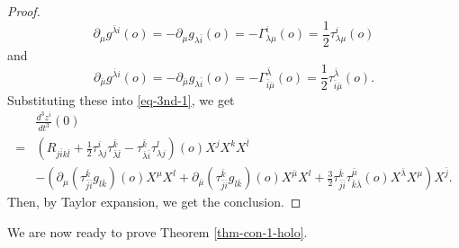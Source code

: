 \documentclass[12pt]{amsart}
\def\bk{{\bar k}}
\def\bl{{\bar l}}
\def\p{\partial}
\theoremstyle{definition}
\theoremstyle{remark}
\numberwithin{equation}{section}
\def\bi{{\bar i}}
\begin{document}
\begin{proof}
\begin{equation}
\p_\mu g^{\bar \lambda i}(o)=-\p_\mu g_{\lambda\bi}(o)=-\Gamma_{\lambda\mu}^i(o)=\frac12\tau_{\lambda\mu}^i(o)
\end{equation}
and
\begin{equation}
\p_{\bar \mu} g^{\bar\lambda i}(o)=-\p_{\bar \mu} g_{\lambda \bi}(o)=-\Gamma_{\bi\bar\mu}^{\bar\lambda}(o)=\frac12\tau_{\bi\bar\mu}^{\bar\lambda}(o).
\end{equation}
Substituting these into \eqref{eq-3nd-1}, we get
\begin{equation}\label{eq-3nd-2}
\begin{split}
&\frac{d^3z^i}{dt^3}(0)\\
=&\left(R_{j\bi k\bl}+\frac12\tau_{\lambda j}^i\tau_{\bar\lambda\bar l}^\bk -\tau_{\bar \lambda \bi}^\bk\tau_{\lambda j}^l\right)(o) X^j X^k X^{\bar l}\\
&-\left(\p_\mu(\tau_{\bar j\bi}^\bk g_{l\bk})(o)X^\mu X^l
+\p_{\bar \mu}(\tau_{\bar j\bi}^\bk g_{l\bk})(o)X^{\bar\mu}X^l+\frac32\tau_{\bar j\bi}^\bk\tau_{\bar k\bar\lambda}^{\bar \mu}(o)X^{\bar\lambda}X^\mu\right) X^{\bar j}.
\end{split}
\end{equation}
Then, by Taylor expansion, we get the conclusion.
\end{proof}
We are now ready to prove Theorem \ref{thm-con-1-holo}.
\end{document}
